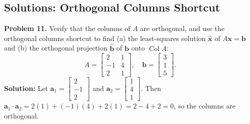 \documentclass[11pt, letterpaper]{article}
\theoremstyle{definition}
\theoremstyle{remark}
\begin{document}
\subsection{Solutions: Orthogonal Columns Shortcut}

\textbf{Problem 11.} Verify that the columns of $A$ are orthogonal, and use the orthogonal columns shortcut to find (a) the least-squares solution $\hat{\mathbf{x}}$ of $A\mathbf{x} = \mathbf{b}$ and (b) the orthogonal projection $\hat{\mathbf{b}}$ of $\mathbf{b}$ onto $\operatorname{Col} A$:
\[
A = \begin{bmatrix} 2 & 1 \\ -1 & 4 \\ 2 & 1 \end{bmatrix}, \quad \mathbf{b} = \begin{bmatrix} 3 \\ 1 \\ 5 \end{bmatrix}.
\]
\textbf{Solution:} Let $\mathbf{a}_1 = \begin{bmatrix} 2 \\ -1 \\ 2 \end{bmatrix}$ and $\mathbf{a}_2 = \begin{bmatrix} 1 \\ 4 \\ 1 \end{bmatrix}$. Then $\mathbf{a}_1 \cdot \mathbf{a}_2 = 2(1) + (-1)(4) + 2(1) = 2 - 4 + 2 = 0$, so the columns are orthogonal.
\end{document}
